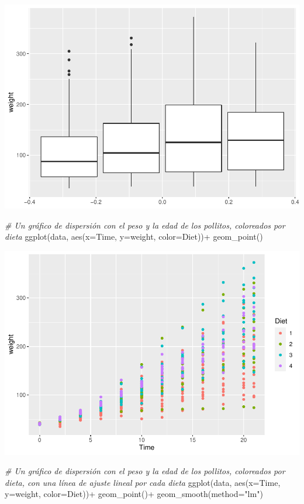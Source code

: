 \documentclass[
]{book}
\newenvironment{Shaded}{\begin{snugshade}}{\end{snugshade}}
\newcommand{\AttributeTok}[1]{\textcolor[rgb]{0.77,0.63,0.00}{#1}}
\newcommand{\CommentTok}[1]{\textcolor[rgb]{0.56,0.35,0.01}{\textit{#1}}}
\newcommand{\FunctionTok}[1]{\textcolor[rgb]{0.00,0.00,0.00}{#1}}
\newcommand{\NormalTok}[1]{#1}
\newcommand{\SpecialCharTok}[1]{\textcolor[rgb]{0.00,0.00,0.00}{#1}}
\newcommand{\StringTok}[1]{\textcolor[rgb]{0.31,0.60,0.02}{#1}}
\begin{document}
\includegraphics{Esatadistica_en_R_files/figure-latex/unnamed-chunk-154-2.pdf}

\begin{Shaded}
\begin{Highlighting}[]
\CommentTok{\# Un gráfico de dispersión con el peso y la edad de los pollitos, coloreados por dieta}
\FunctionTok{ggplot}\NormalTok{(data, }\FunctionTok{aes}\NormalTok{(}\AttributeTok{x=}\NormalTok{Time, }\AttributeTok{y=}\NormalTok{weight, }\AttributeTok{color=}\NormalTok{Diet))}\SpecialCharTok{+}
  \FunctionTok{geom\_point}\NormalTok{()}
\end{Highlighting}
\end{Shaded}

\includegraphics{Esatadistica_en_R_files/figure-latex/unnamed-chunk-154-3.pdf}

\begin{Shaded}
\begin{Highlighting}[]
\CommentTok{\# Un gráfico de dispersión con el peso y la edad de los pollitos, coloreados por dieta, con una línea de ajuste lineal por cada dieta}
\FunctionTok{ggplot}\NormalTok{(data, }\FunctionTok{aes}\NormalTok{(}\AttributeTok{x=}\NormalTok{Time, }\AttributeTok{y=}\NormalTok{weight, }\AttributeTok{color=}\NormalTok{Diet))}\SpecialCharTok{+}
  \FunctionTok{geom\_point}\NormalTok{()}\SpecialCharTok{+}
  \FunctionTok{geom\_smooth}\NormalTok{(}\AttributeTok{method=}\StringTok{"lm"}\NormalTok{)}
\end{Highlighting}
\end{Shaded}
\end{document}
